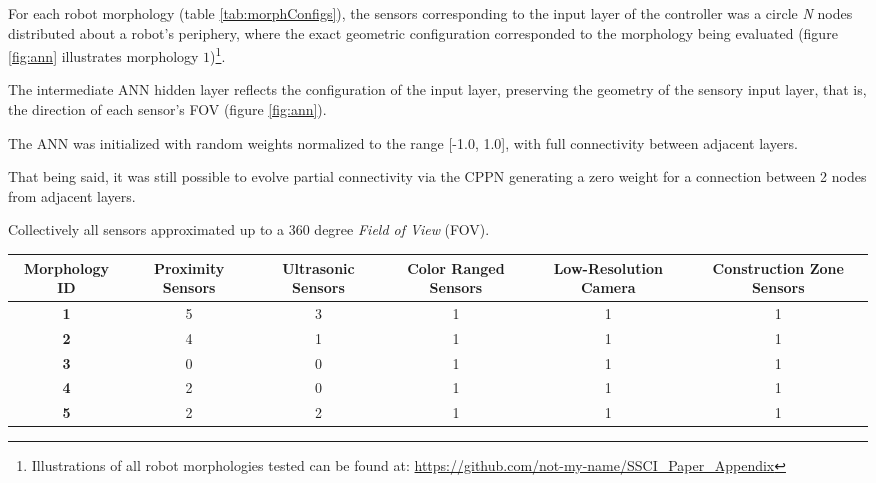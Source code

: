 For each robot morphology (table \ref{tab:morphConfigs}), the sensors corresponding to the input layer
of the controller was a circle \textit{N} nodes distributed about a robot's periphery,
where the exact geometric configuration corresponded to the morphology being evaluated
(figure \ref{fig:ann} illustrates morphology
$1$)\footnote{Illustrations of all robot morphologies tested can be found at: \url{https://github.com/not-my-name/SSCI_Paper_Appendix}}.

The intermediate ANN hidden layer reflects the configuration of the input layer, preserving
the geometry of the sensory input layer, that is, the direction of each sensor's FOV (figure
\ref{fig:ann}).

The ANN was initialized with random weights normalized to the range [-1.0, 1.0], with full connectivity between adjacent layers.

That being said, it was still possible to evolve partial connectivity via the CPPN generating a zero weight for a connection between 2 nodes from adjacent layers.

Collectively all sensors approximated up to a $360$ degree \textit{Field of View} (FOV).



\begin{table*} [t]
	\renewcommand{\arraystretch}{1.50}
	\caption{Sensory configuration (number of sensors) for each morphology.}\label{tab:morphConfigs}
	\centering
	\begin{tabular}{| c | c | c | c | c | c |}
		\hline
\textbf{Morphology ID} & \textbf{Proximity Sensors} & \textbf{Ultrasonic Sensors} & \textbf{Color Ranged Sensors} & \textbf{Low-Resolution Camera} & 	 \textbf{Construction Zone Sensors} \\
		\hline
		\textbf{1}               &	5 	 	    & 	3  	             &	1               &	1                &	1   \\
		\textbf{2}               &	4 	 	    &	1		         &	1	            &	1                &	1   \\
		\textbf{3}               &	0 	        &	0				 &	1			    &	1                &	1    \\
		\textbf{4}               &	2 		 	&	0	     		 &	1		        &	1                &	1    \\
		\textbf{5}               &	2  	        & 	2				 &  1               &	1                &	1    \\
		\hline
	\end{tabular}
\end{table*}


